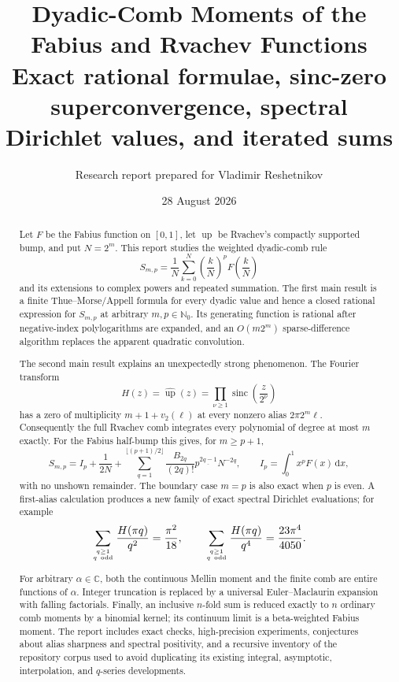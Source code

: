 \documentclass[11pt]{article}
\title{\textbf{Dyadic-Comb Moments of the Fabius and Rvachev Functions}\\[4pt]
\large Exact rational formulae, sinc-zero superconvergence, spectral Dirichlet values, and iterated sums}
\author{Research report prepared for Vladimir Reshetnikov}
\date{28 August 2026}
\theoremstyle{definition}
\theoremstyle{remark}
\newcommand{\up}{\operatorname{up}}
\newcommand{\sinc}{\operatorname{sinc}}
\newcommand{\N}{\mathbb N}
\newcommand{\C}{\mathbb C}
\newcommand{\fall}[2]{#1^{\underline{#2}}}
\newcommand{\dd}{\,\mathrm d}
\begin{document}
\maketitle

\begin{abstract}
Let $F$ be the Fabius function on $[0,1]$, let $\up$ be Rvachev's compactly
supported bump, and put $N=2^m$.  This report studies the weighted dyadic-comb
rule
\[
 S_{m,p}=\frac1N\sum_{k=0}^{N}\left(\frac{k}{N}\right)^pF\!\left(\frac{k}{N}\right)
\]
and its extensions to complex powers and repeated summation.  The first main
result is a finite Thue--Morse/Appell formula for every dyadic value and hence a
closed rational expression for $S_{m,p}$ at arbitrary $m,p\in\N_0$.  Its
generating function is rational after negative-index polylogarithms are
expanded, and an $O(m2^m)$ sparse-difference algorithm replaces the apparent
quadratic convolution.

The second main result explains an unexpectedly strong phenomenon.  The
Fourier transform
\[
 H(z)=\widehat{\up}(z)=\prod_{\nu\ge1}\sinc\!\left(\frac{z}{2^\nu}\right)
\]
has a zero of multiplicity $m+1+v_2(\ell)$ at every nonzero alias
$2\pi 2^m\ell$.  Consequently the full Rvachev comb integrates every
polynomial of degree at most $m$ exactly.  For the Fabius half-bump this gives,
for $m\ge p+1$,
\[
 S_{m,p}=I_p+\frac{1}{2N}
 +\sum_{q=1}^{\lfloor(p+1)/2\rfloor}
   \frac{B_{2q}}{(2q)!}\fall{p}{2q-1}N^{-2q},
 \qquad I_p=\int_0^1x^pF(x)\dd x,
\]
with no unshown remainder.  The boundary case $m=p$ is also exact when $p$ is
even.  A first-alias calculation produces a new family of exact spectral
Dirichlet evaluations; for example
\[
 \sum_{q\ge1\atop q\ \mathrm{odd}}\frac{H(\pi q)}{q^2}=\frac{\pi^2}{18},
 \qquad
 \sum_{q\ge1\atop q\ \mathrm{odd}}\frac{H(\pi q)}{q^4}=\frac{23\pi^4}{4050}.
\]

For arbitrary $\alpha\in\C$, both the continuous Mellin moment and the finite
comb are entire functions of $\alpha$.  Integer truncation is replaced by a
universal Euler--Maclaurin expansion with falling factorials.  Finally, an
inclusive $n$-fold sum is reduced exactly to $n$ ordinary comb moments by a
binomial kernel; its continuum limit is a beta-weighted Fabius moment.  The
report includes exact checks, high-precision experiments, conjectures about
alias sharpness and spectral positivity, and a recursive inventory of the
repository corpus used to avoid duplicating its existing integral,
asymptotic, interpolation, and $q$-series developments.
\end{abstract}
\end{document}
